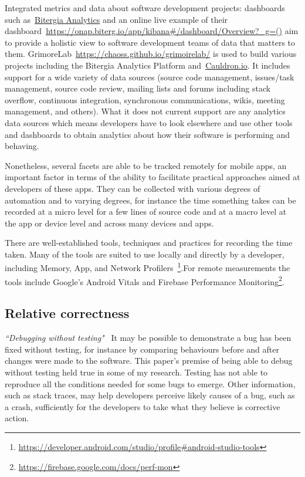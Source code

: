 Integrated metrics and data about software development projects: dashboards such as~\href{https://bitergia.com/bitergia-analytics/}{Bitergia Analytics} and an online live example of their dashboard~\url{https://onap.biterg.io/app/kibana#/dashboard/Overview?_g=()} aim to provide a holistic view to software development teams of data that matters to them. 
GrimoreLab~\url{https://chaoss.github.io/grimoirelab/} is used to build various projects including the Bitergia Analytics Platform and~\href{https://cauldron.io/dashboard/1640}{Cauldron.io}. It includes support for a wide variety of data sources (source code management, issues/task management, source code review, mailing lists and forums including stack overflow, continuous integration, synchronous communications, wikis, meeting management, and others). What it does not current support are any analytics data sources which means developers have to look elsewhere and use other tools and dashboards to obtain analytics about how their software is performing and behaving. 


Nonetheless, several facets are able to be tracked remotely for mobile apps, an important factor in terms of the ability to facilitate practical approaches aimed at developers of these apps. They can be collected with various degrees of automation and to varying degrees, for instance the time something takes can be recorded at a micro level for a few lines of source code and at a macro level at the app or device level and across many devices and apps. 

There are well-established tools, techniques and practices for recording the time taken. Many of the tools are suited to use locally and directly by a developer, including Memory, App, and Network Profilers~\footnote{\url{https://developer.android.com/studio/profile\#android-studio-tools}}.For remote measurements the tools include Google's Android Vitals and Firebase Performance Monitoring\footnote{\url{https://firebase.google.com/docs/perf-mon}}.

\subsection{Relative correctness}
\emph{``Debugging without testing"}~\cite{ghardallou2016debugging_without_testing} It may be possible to demonstrate a bug has been fixed without testing, for instance by comparing behaviours before and after changes were made to the software. This paper's premise of being able to debug without testing held true in some of my research. Testing has not able to reproduce all the conditions needed for some bugs to emerge. Other information, such as stack traces, may help developers perceive likely causes of a bug, such as a crash, sufficiently for the developers to take what they believe is corrective action. 


